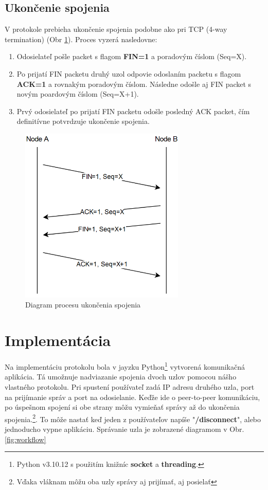 \documentclass[a4paper,12pt]{article}
\begin{document}
	\subsection{Ukončenie spojenia}
		V protokole prebieha ukončenie spojenia podobne ako pri TCP (4-way termination) (Obr \ref{fig:disconnect_diagram}). Proces vyzerá nasledovne:
		\begin{enumerate}
			\item Odosielateľ pošle packet s flagom \textbf{FIN=1} a poradovým číslom (Seq=X).
			\item Po prijatí FIN packetu druhý uzol odpovie odoslaním packetu s flagom \textbf{ACK=1} a rovnakým poradovým číslom. Následne odošle aj FIN packet s novým poardovým číslom (Seq=X+1).
			\item Prvý odosielateľ po prijatí FIN packetu odošle posledný ACK packet, čím definitívne potvrdzuje ukončenie spojenia.

		\end{enumerate}
			
		\begin{figure}[h]
		    \centering
		    \includegraphics[width=0.70\textwidth]{disconnect_diagram.png}
		    \caption{Diagram procesu ukončenia spojenia}
		    \label{fig:disconnect_diagram}
		\end{figure}


\section{Implementácia}
    Na implementáciu protokolu bola v jayzku Python\footnote{Python v3.10.12 s použitím knižníc \textbf{socket} a \textbf{threading}.} vytvorená komunikačná aplikácia. Tá umožnuje nadviazanie spojenia dvoch uzlov pomocou nášho vlastného protokolu. Pri spustení používateľ zadá IP adresu druhého uzla, port na prijímanie správ a port na odosielanie. Keďže ide o peer-to-peer komunikáciu, po úspešnom spojení si obe strany môžu vymieňať správy až do ukončenia spojenia.\footnote{Vďaka vláknam môžu oba uzly správy aj prijímať, aj posielať}. To môže nastať keď jeden z používateľov napíše "\textbf{/disconnect}", alebo jednoducho vypne aplikáciu. Správanie uzla je zobrazené diagramom v Obr. \ref{fig:workflow}
\end{document}
